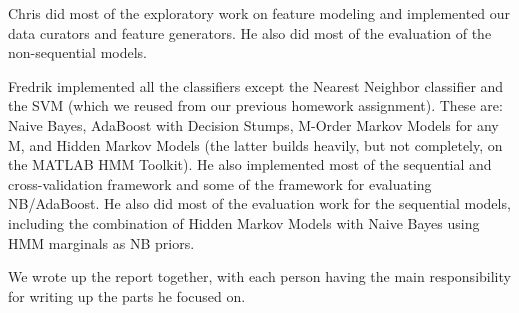 \documentclass[10pt, twocolumn]{article}
\begin{document}
Chris did most of the exploratory work on feature modeling and implemented our data curators and feature generators.
He also did most of the evaluation of the non-sequential models.

Fredrik implemented all the classifiers except the Nearest Neighbor classifier and the SVM (which we reused from our previous homework assignment).
These are: Naive Bayes, AdaBoost with Decision Stumps, M-Order Markov Models for any M, and Hidden Markov Models (the latter builds heavily, but not completely, on the MATLAB HMM Toolkit).
He also implemented most of the sequential and cross-validation framework and some of the framework for evaluating NB/AdaBoost.
He also did most of the evaluation work for the sequential models, including the combination of Hidden Markov Models with Naive Bayes using HMM marginals as NB priors.

We wrote up the report together, with each person having the main responsibility for writing up the parts he focused on.




\end{document}
